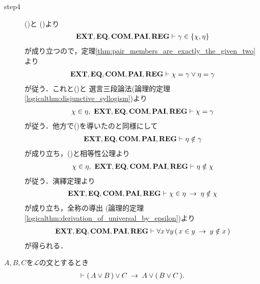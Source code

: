\begin{sketch}
\begin{description}
			\item[step4] ()と
				()より
				\begin{align}
					\mbox{{\bf EXT}},\mbox{{\bf EQ}},\mbox{\bf COM},\mbox{{\bf PAI}},\mbox{{\bf REG}} \vdash \gamma \in \{\chi,\eta\}
				\end{align}
				が成り立つので，定理\ref{thm:pair_members_are_exactly_the_given_two}より
				\begin{align}
					\mbox{{\bf EXT}},\mbox{{\bf EQ}},\mbox{\bf COM},\mbox{{\bf PAI}},\mbox{{\bf REG}} \vdash 
					\chi = \gamma \vee \eta = \gamma
				\end{align}
				が従う．これと()と
				選言三段論法(論理的定理\ref{logicalthm:disjunctive_syllogism})より
				\begin{align}
					\chi \in \eta,\ \mbox{{\bf EXT}},\mbox{{\bf EQ}},\mbox{\bf COM},\mbox{{\bf PAI}},\mbox{{\bf REG}} \vdash 
					\chi = \gamma
					\label{fom:no_pair_of_sets_go_round_9}
				\end{align}
				が従う．他方で()を導いたのと同様にして
				\begin{align}
					\mbox{{\bf EXT}},\mbox{{\bf EQ}},\mbox{\bf COM},\mbox{{\bf PAI}},\mbox{{\bf REG}} \vdash \eta \notin \gamma
				\end{align}
				が成り立ち，()と相等性公理より
				\begin{align}
					\chi \in \eta,\ \mbox{{\bf EXT}},\mbox{{\bf EQ}},\mbox{\bf COM},\mbox{{\bf PAI}},\mbox{{\bf REG}} \vdash 
					\eta \notin \chi
				\end{align}
				が従う．演繹定理より
				\begin{align}
					\mbox{{\bf EXT}},\mbox{{\bf EQ}},\mbox{\bf COM},\mbox{{\bf PAI}},\mbox{{\bf REG}} \vdash 
					\chi \in \eta \hspace{0.25em}\rightarrow\hspace{0.25em} \eta \notin \chi
				\end{align}
				が成り立ち，全称の導出
				(論理的定理\ref{logicalthm:derivation_of_universal_by_epsilon})より
				\begin{align}
					\mbox{{\bf EXT}},\mbox{{\bf EQ}},\mbox{\bf COM},\mbox{{\bf PAI}},\mbox{{\bf REG}} \vdash 
					\forall x\, \forall y\, (\, x \in y \hspace{0.25em}\rightarrow\hspace{0.25em} y \notin x\, )
				\end{align}
				が得られる．
				\QED
		\end{description}
	\end{sketch}
	
	\begin{screen}
		\begin{logicalthm}[論理和の結合律]
		\label{logicalthm:associative_law_of_conjunctions}
			$A,B,C$を$\mathcal{L}$の文とするとき
			\begin{align}
				\vdash (\, A \vee B\, ) \vee C \hspace{0.25em}\rightarrow\hspace{0.25em} A \vee (\, B \vee C\, ).
			\end{align}
		\end{logicalthm}
	\end{screen}
	
